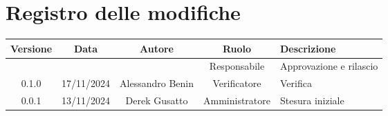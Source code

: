 
\section*{Registro delle modifiche}
\begin{table}[H]
    \begin{tabular}{|c|c|c|c|p{5cm}|}
        \hline
         \textbf{Versione} &  \textbf{Data} &  \textbf{Autore} &  \textbf{Ruolo} & \textbf{Descrizione} \\
          \hline
          &  &  & Responsabile & Approvazione e rilascio\\
          \hline
          0.1.0 & 17/11/2024 & Alessandro Benin & Verificatore  & Verifica \\
          \hline
           0.0.1 & 13/11/2024 & Derek Gusatto & Amministratore  & Stesura iniziale \\
          \hline
    \end{tabular}
\end{table}